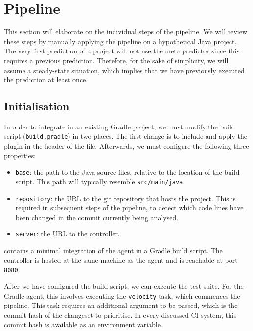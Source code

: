 
\section{Pipeline}
\label{sec:velocity-pipeline}
This section will elaborate on the individual steps of the pipeline. We will review these steps by manually applying the pipeline on a hypothetical Java project. The very first prediction of a project will not use the meta predictor since this requires a previous prediction. Therefore, for the sake of simplicity, we will assume a steady-state situation, which implies that we have previously executed the prediction at least once.

\subsection{Initialisation}\label{ssec:pipeline-initialisation}
In order to integrate \velocity{} in an existing Gradle project, we must modify the build script (\texttt{build.gradle}) in two places. The first change is to include and apply the plugin in the header of the file. Afterwards, we must configure the following three properties:
\begin{itemize}
	\item \texttt{base}: the path to the Java source files, relative to the location of the build script. This path will typically resemble \texttt{src/main/java}.
	
	\item \texttt{repository}: the URL to the git repository that hosts the project. This is required in subsequent steps of the pipeline, to detect which code lines have been changed in the commit currently being analysed.
	
	\item \texttt{server}: the URL to the controller.
\end{itemize}

\noindent {} contains a minimal integration of the agent in a Gradle build script. The controller is hosted at the same machine as the agent and is reachable at port \texttt{8080}.



\noindent After we have configured the build script, we can execute the test suite. For the Gradle agent, this involves executing the \texttt{velocity} task, which commences the pipeline. This task requires an additional argument to be passed, which is the commit hash of the changeset to prioritise. In every discussed CI system, this commit hash is available as an environment variable.\\

